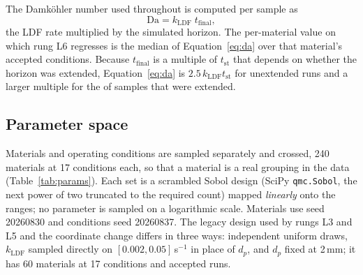 The Damk\"ohler number used throughout is computed per sample as
\begin{equation}
\mathrm{Da} = k_{\mathrm{LDF}}\; t_{\mathrm{final}},
\label{eq:da}
\end{equation}
the LDF rate multiplied by the simulated horizon. The per-material value on which rung
L6 regresses is the median of Equation~\eqref{eq:da} over that material's accepted
conditions. Because \(t_{\mathrm{final}}\) is a multiple of \(t_{\mathrm{st}}\) that
depends on whether the horizon was extended, Equation~\eqref{eq:da} is \(2.5\,k_{\mathrm{LDF}}t_{\mathrm{st}}\)
for unextended runs and a larger multiple for the
of samples that were extended.

\subsection*{Parameter space}

Materials and operating conditions are sampled separately and crossed, 240 materials
at 17 conditions each, so that a material is a real grouping in the data
(Table~\ref{tab:params}). Each set is a scrambled Sobol design (SciPy \texttt{qmc.Sobol},
the next power of two truncated to the required count) mapped \emph{linearly} onto the
ranges; no parameter is sampled on a logarithmic scale. Materials use seed 20260830 and
conditions seed 20260837.
The legacy design used by rungs L3 and L5 and the coordinate change differs in three
ways: independent uniform draws, \(k_{\mathrm{LDF}}\) sampled directly on
\([0.002, 0.05]\)\,s\(^{-1}\) in place of \(d_p\), and \(d_p\) fixed at 2\,mm; it has
60 materials at 17 conditions and 
accepted runs.

